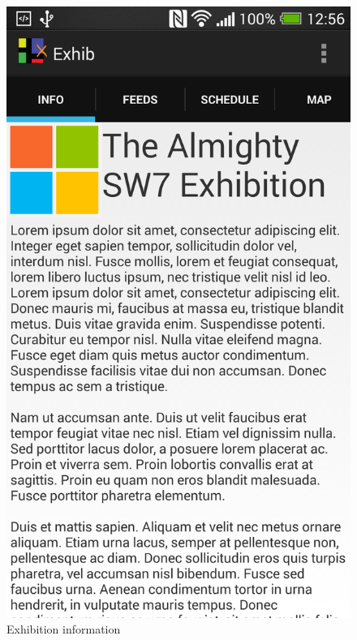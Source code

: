 \begin{figure}[H]
\begin{minipage}[b]{0.5\columnwidth}
\centering
\includegraphics[width=0.7\columnwidth]{img/finaldesign/infoscreen.png}
\caption{Exhibition information}
\label{fig:infoscreen}
\end{minipage}
\hspace{0.5cm}
\begin{minipage}[b]{0.5\columnwidth}
\centering

\end{minipage}
\end{figure}
